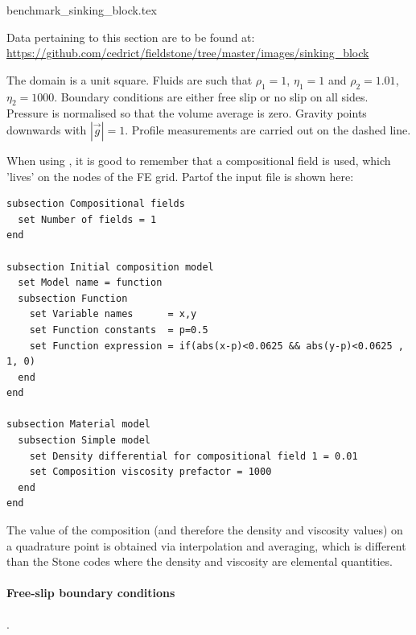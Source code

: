 \begin{flushright} {\tiny {\color{gray} benchmark\_sinking\_block.tex}} \end{flushright}


\vspace{1cm}
\begin{flushright}
Data pertaining to this section are to be found at:
\url{https://github.com/cedrict/fieldstone/tree/master/images/sinking_block}
\end{flushright}
\vspace{1cm}

The domain is a unit square. Fluids are such that 
$\rho_1=1$, $\eta_1=1$ and $\rho_2=1.01$, $\eta_2=1000$.
Boundary conditions are either free slip or no slip on all sides. 
Pressure is normalised so that the volume average is zero. 
Gravity points downwards with $|\vec{g}|=1$.
Profile measurements are carried out on the dashed line.


\begin{center}

\end{center}

When using \aspect{}, it is good to remember that a compositional field is used, 
which 'lives' on the nodes of the FE grid. Partof the input file is shown here: 

\begin{verbatim}
subsection Compositional fields
  set Number of fields = 1 
end 

subsection Initial composition model
  set Model name = function
  subsection Function
    set Variable names      = x,y 
    set Function constants  = p=0.5
    set Function expression = if(abs(x-p)<0.0625 && abs(y-p)<0.0625 , 1, 0)
  end 
end

subsection Material model
  subsection Simple model
    set Density differential for compositional field 1 = 0.01
    set Composition viscosity prefactor = 1000
  end 
end
\end{verbatim}

The value of the composition (and therefore 
the density and viscosity values) on a quadrature point is obtained via interpolation 
and averaging, which is different than the Stone codes where the density 
and viscosity are elemental quantities.

\newpage
\paragraph{Free-slip boundary conditions}.

